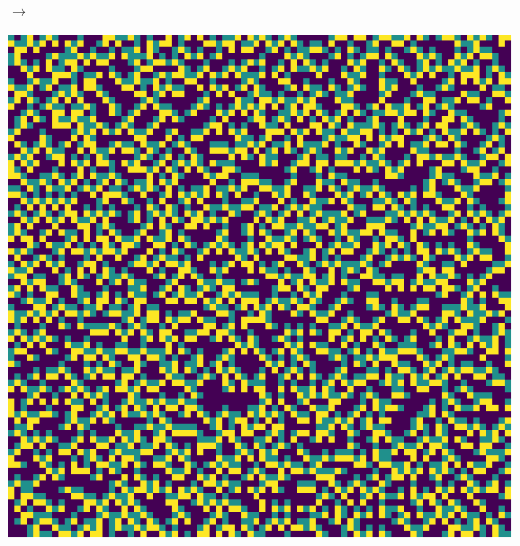 \documentclass[12pt, a4paper]{article}
\begin{document}
\begin{center}
\begin{minipage}{.17\linewidth}
            \end{minipage}
            $\rightarrow$
            \begin{minipage}{.17\linewidth}
                \includegraphics[scale=0.15]{img/part1/step5.png}
            \end{minipage}
        \end{center}
    
    
\end{document}
